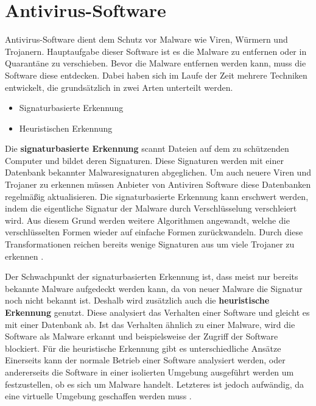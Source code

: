 \section{Antivirus-Software}\label{sec:antivirus}
Antivirus-Software dient dem Schutz vor Malware wie Viren, Würmern und Trojanern.
Hauptaufgabe dieser Software ist es die Malware zu entfernen oder in Quarantäne zu verschieben.
Bevor die Malware entfernen werden kann, muss die Software diese entdecken.
Dabei haben sich im Laufe der Zeit mehrere Techniken entwickelt, die grundsätzlich 
in zwei Arten unterteilt werden.\cite{ANTNE1}
\begin{itemize}
    \item Signaturbasierte Erkennung
    \item Heuristischen Erkennung
\end{itemize}
Die \textbf{signaturbasierte Erkennung} scannt Dateien auf dem zu schützenden Computer 
und bildet deren Signaturen. 
Diese Signaturen werden mit einer Datenbank bekannter Malwaresignaturen abgeglichen.
Um auch neuere Viren und Trojaner zu erkennen müssen Anbieter von Antiviren Software diese Datenbanken regelmäßig aktualisieren.
Die signaturbasierte Erkennung kann erschwert werden, indem die eigentliche Signatur der Malware durch Verschlüsselung verschleiert wird.
Aus diesem Grund werden weitere Algorithmen angewandt, welche die verschlüsselten Formen wieder auf einfache Formen zurückwandeln.
Durch diese Transformationen reichen bereits wenige Signaturen aus um
viele Trojaner zu erkennen \cite{ANTNE2}.

Der Schwachpunkt der signaturbasierten Erkennung ist, dass meist nur bereits bekannte Malware aufgedeckt werden kann,
da von neuer Malware die Signatur noch nicht bekannt ist.
Deshalb wird zusätzlich auch die \textbf{heuristische Erkennung} genutzt. 
Diese analysiert das Verhalten einer Software und gleicht es mit einer Datenbank ab.
Ist das Verhalten ähnlich zu einer Malware, wird die Software als Malware erkannt und beispielsweise der Zugriff der Software blockiert.
Für die heuristische Erkennung gibt es unterschiedliche Ansätze
Einerseits kann der normale Betrieb einer Software analysiert werden,
oder andererseits die Software in einer isolierten Umgebung ausgeführt werden um festzustellen,
ob es sich um Malware handelt. 
Letzteres ist jedoch aufwändig, da eine virtuelle Umgebung geschaffen werden muss \cite{ANTNE3}.

